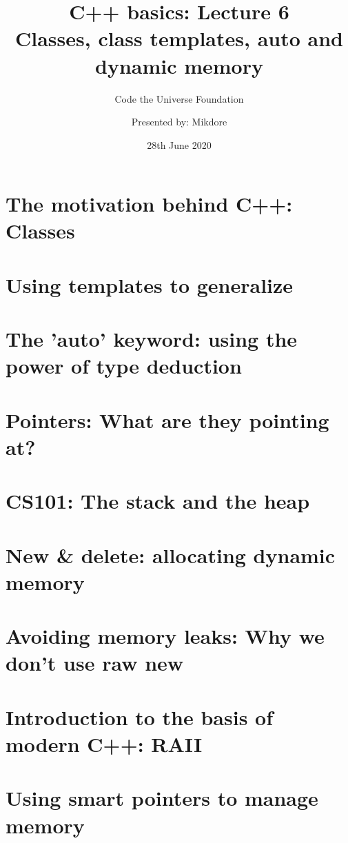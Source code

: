 \documentclass{article}
\title  {%
            C++ basics: Lecture 6 \\
            \large Classes, class templates, auto and dynamic memory
        }
\author{Code the Universe Foundation \and
Presented by: Mikdore}
\date{28th June 2020}
\begin{document}
\maketitle

\section{The motivation behind C++: Classes}
\section{Using templates to generalize}
\section{The 'auto' keyword: using the power of type deduction}
\section{Pointers: What are they pointing at?}
\section{CS101: The stack and the heap}
\section{New \& delete: allocating dynamic memory}
\section{Avoiding memory leaks: Why we don't use raw new}
\section{Introduction to the basis of modern C++: RAII}
\section{Using smart pointers to manage memory}
\end{document}
